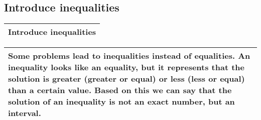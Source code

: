 \subsection{
Introduce inequalities}
\begin{small}
    \begin{tabularx}{1\textwidth}{
            p{}
        }
        \toprule
        Introduce inequalities
        \\
        \bottomrule
    \end{tabularx}
\end{small}
\begin{small}
    \begin{tabularx}{1\textwidth}{
            p{}
        }
        \toprule
        Some problems lead to inequalities instead of equalities. An inequality
        looks like an equality, but it represents that the solution is greater
        (greater or equal) or less (less or equal) than a certain value. Based
        on this we can say that the solution of an inequality is not an exact
        number, but an interval.
        \\
        \bottomrule
    \end{tabularx}
\end{small}
